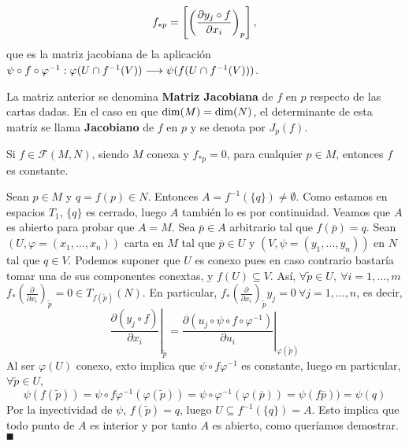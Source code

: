 \documentclass[Cursovd_portada.tex]{subfiles}
\begin{document}
$$f_{*p}=\left[\left(\displaystyle{\frac{\partial y_j\circ f}{\partial x_i}}\right)_p\right],$$
que es la matriz jacobiana de la aplicación $\psi\circ f\circ\varphi^{-1}:\varphi(U\cap f^{-1}(V))\longrightarrow\psi(f(U\cap
f^{-1}(V)))$.
\begin{defi}
La matriz anterior se denomina {\bf Matriz Jacobiana} de $f$ en $p$ respecto de las cartas dadas. En el caso en
que ${\rm dim}(M)={\rm dim}(N)$, el determinante de esta matriz se llama {\bf Jacobiano} de $f$ en $p$ y se denota
por $J_p(f)$.
\end{defi}
\begin{prop} Si $f\in\mathcal{F}(M,N)$, siendo $M$ conexa y $f_{*p}=0$, para cual\-quier $p\in M$, entonces $f$
es constante.
\end{prop}
\begin{dem}
Sean $p\in M$ y $q=f(p)\in N$. Entonces $A=f^{-1}(\{q\})\neq\emptyset$. Como estamos en espacios $T_1$, $\{q\}$ es cerrado, luego $A$ también lo es por continuidad. Veamos que $A$ es abierto para probar que $A=M$. Sea $\overline{p}\in A$ arbitrario tal que $f(\overline{p})=q$. Sean $(U,\varphi=(x_1,\dots,x_n))$ carta en $M$ tal que $\overline{p}\in U$ y $(V,\psi=(y_1,\dots,y_n))$ en $N$ tal que $q\in V$. Podemos suponer que $U$ es conexo pues en caso contrario bastaría tomar una de sus componentes conextas, y $f(U)\subseteq V$. Así, $\forall \tilde{p}\in U,\ \forall i=1,\dots, m$ $f_*\left(\frac{\partial}{\partial x_i}\right)_{\tilde{p}}=0\in T_{f(\tilde{p})}(N)$. En particular, $f_*\left(\frac{\partial}{\partial x_i}\right)_{\tilde{p}}y_j=0\ \forall j=1,\dots, n$, es decir, 
$$\left.\frac{\partial(y_j\circ f)}{\partial x_i}\right|_{\tilde{p}}=\left.\frac{\partial(u_j\circ\psi\circ f\circ\varphi^{-1})}{\partial u_i}\right|_{\varphi(\tilde{p})}$$
Al ser $\varphi(U)$ conexo, exto implica que $\psi\circ f\varphi^{-1}$ es constante, luego en particular, $\forall \tilde{p}\in U$, 
$$\psi(f(\tilde{p}))=\psi\circ f\varphi^{-1}(\varphi(\tilde{p}))=\psi\circ\varphi^{-1}(\varphi(\overline{p}))=\psi(f\overline{p}))=\psi(q)$$
Por la inyectividad de $\psi$, $f(\tilde{p})=q$, luego $U\subseteq f^{-1}(\{q\})=A$. Esto implica que todo punto de $A$ es interior y por tanto $A$ es abierto, como queríamos demostrar. $\QED$
\end{dem}
\end{document}
